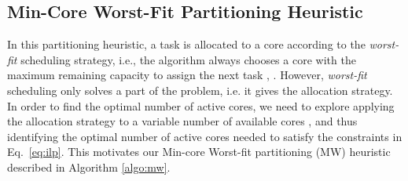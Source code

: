 \documentclass[conference]{IEEEtran}
\begin{document}
\vspace{-0.1in}

\subsection{Min-Core Worst-Fit Partitioning Heuristic}

In this partitioning heuristic, a task is allocated to a core according to  the
\emph{worst-fit} scheduling strategy, i.e.,
the algorithm always chooses a core with the maximum remaining capacity to assign the next task \cite{Langen09}, \cite{Aydin03}.
However,  \emph{worst-fit} scheduling only solves a part of the problem, i.e. it gives the allocation strategy.
In order to find the optimal number of active cores,
we need to explore applying the allocation strategy to a variable number of available cores \cite{Langen09},
and thus identifying the optimal number of active cores needed to
satisfy  the constraints in Eq.~\ref{eq:ilp}.
This motivates our Min-core Worst-fit partitioning (MW) heuristic described in Algorithm \ref{algo:mw}.
\end{document}
